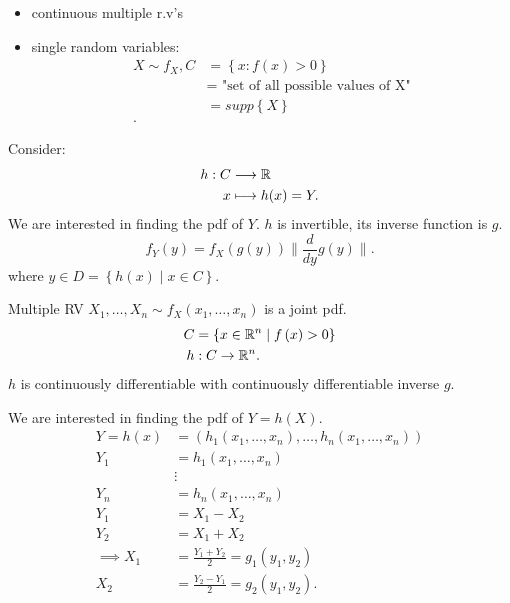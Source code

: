 
\begin{itemize}
	\item continuous multiple r.v's
	\item single random variables:
		\begin{align*}
			X \sim f_{X}, C &= \left\{ x: f\left( x \right) > 0 \right\}  \\
			&= \text{ "set of all possible values of X"} \\
			 &= supp\left\{ X \right\}  \\
		.\end{align*}
\end{itemize}

Consider: \begin{align*}
	h : C &\longrightarrow \mathbb{R} \\
	x &\longmapsto h (x) = Y
.\end{align*}
We are interested in finding the pdf of $Y$. $h$ is invertible, its inverse function is $g$. 
\[
	f_{Y}\left( y \right) = f_{X}\left( g\left( y \right)  \right)  \|\frac{d}{dy} g\left( y \right) \|
.\] where $y \in D = \left\{ h\left( x \right)  \mid x \in  C \right\} $. 

Multiple RV $X_{1} , \ldots , X_{n} \sim f_{X}\left( x_{1} , \ldots , x_{n} \right) $ is a joint pdf. 
\begin{align*}
	C &= \left\{ x \in  \mathbb{R}^{n} \mid f\left( x  \right) > 0 \right\}  \\
	h  &: C \to \mathbb{R}^{n}
.\end{align*}
$h $ is continuously differentiable with continuously differentiable inverse $g$.

We are interested in finding the pdf of $Y = h\left( X \right) $. 
\begin{align*}
Y =  	h\left( x \right) &= \left(h_{1}\left( x_{1} , \ldots  , x_{n} \right)  , \ldots , h_{n}\left( x_{1} , \ldots , x_{n} \right) \right)\\
	Y_1 &=  h_{1}\left( x_{1} , \ldots  , x_{n} \right)\\
	    &\vdots\\
	  Y_{n} &= h_{n}\left( x_{1} , \ldots , x_{n} \right) \\  
	Y_1 &= X_1 - X_2\\
	Y_2 &= X_1 + X_2\\
	\implies X_1 &= \frac{Y_1 + Y_2}{2} = g_1\left( y_1, y_2 \right)  \\
	X_2 &= \frac{Y_2 - Y_1}{2} = g_2\left( y_1, y_2 \right) 
.\end{align*}

